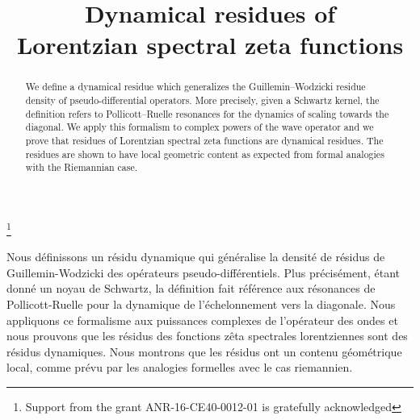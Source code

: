 \documentclass[JEP,XML,SOM,Unicode]{cedram}
\theoremstyle{definition}
\begin{document}
\frontmatter

\title[Dynamical residues of Lorentzian spectral zeta functions]{Dynamical residues of\\ Lorentzian spectral zeta functions}

\author[\initial{N. V.} \lastname{Dang}]{ }
\address{Institut de Mathématiques de Jussieu, Sorbonne Université -- Université de Paris\\
4 pl.~Jussieu, 75252 Paris, France}

\author[\initial{M.} \lastname{Wrochna}]{ }
\address{Laboratoire Analyse Géométrie Modélisation, CY Cergy Paris Université\\
2 av.~Adolphe Chauvin, 95302 Cergy-Pontoise, France}

\thanks{Support from the grant ANR-16-CE40-0012-01 is gratefully acknowledged}



\begin{abstract}
We define a dynamical residue which generalizes the Guillemin--Wodzicki residue density of pseudo-differential operators. More precisely, given a Schwartz kernel, the definition refers to Pollicott--Ruelle resonances for the dynamics of scaling towards the diagonal. We apply this formalism to complex powers of the wave operator and we prove that residues of Lorentzian spectral zeta functions are dynamical residues. The residues are shown to have local geometric content as expected from formal analogies with the Riemannian case.
\end{abstract}



\begin{altabstract}
Nous définissons un résidu dynamique qui généralise la densité de résidus de Guillemin-Wodzicki des opérateurs pseudo-différentiels. Plus précisément, étant donné un noyau de Schwartz, la définition fait référence aux résonances de Pollicott-Ruelle pour la dynamique de l'échelonnement vers la diagonale. Nous appliquons ce formalisme aux puissances complexes de l'opérateur des ondes et nous prouvons que les résidus des fonctions zêta spectrales lorentziennes sont des résidus dynamiques. Nous montrons que les résidus ont un contenu géométrique local, comme prévu par les analogies formelles avec le cas riemannien.
\end{altabstract}
\maketitle
\tableofcontents
\mainmatter
\end{document}
